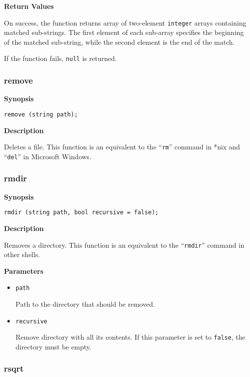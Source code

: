 \documentclass[a4paper, 10pt, titlepage]{article}
\begin{document}
\textbf{Return Values}

On success, the function returns array of two-element \texttt{integer} arrays containing matched sub-strings. The first element of each sub-array specifies the beginning of the matched sub-string, while the second element is the end of the match.

If the function fails, \texttt{null} is returned.

\subsubsection{remove}

\textbf{Synopsis}

\begin{verbatim}
remove (string path);
\end{verbatim}

\textbf{Description}

Deletes a file. This function is an equivalent to the ``\texttt{rm}'' command in *nix and ``\texttt{del}'' in Microsoft Windows.

\subsubsection{rmdir}

\textbf{Synopsis}

\begin{verbatim}
rmdir (string path, bool recursive = false);
\end{verbatim}

\textbf{Description}

Removes a directory. This function is an equivalent to the ``\texttt{rmdir}'' command in other shells.

\textbf{Parameters}

\begin{itemize}
\item \texttt{path}

Path to the directory that should be removed.

\item \texttt{recursive}

Remove directory with all its contents. If this parameter is set to \texttt{false}, the directory must be empty.
\end{itemize}

\subsubsection{rsqrt}
\end{document}
